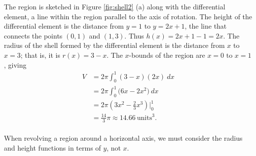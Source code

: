 {The region is sketched in Figure \ref{fig:shell2} (a) along with the differential element, a line within the region parallel to the axis of rotation. 
The height of the differential element is the distance from $y=1$ to $y=2x+1$, the line that connects the points $(0,1)$ and $(1,3)$. Thus $h(x) = 2x+1-1 = 2x$. The radius of the shell formed by the differential element is the distance from $x$ to $x=3$; that is, it is $r(x)=3-x$. The $x$-bounds of the region are $x=0$ to $x=1$, giving
\begin{align*}
V &=	2\pi\int_0^1 (3-x)(2x)\ dx \\
	&= 2\pi\int_0^1 \big(6x-2x^2)\ dx \\
	&= 2\pi\left(3x^2-\frac23x^3\right)\Big|_0^1\\
	&= \frac{14}{3}\pi\approx 14.66 \ \text{units}^3.
\end{align*}
}\\

When revolving a region around a horizontal axis, we must consider the radius and height functions in terms of $y$, not $x$.\\

